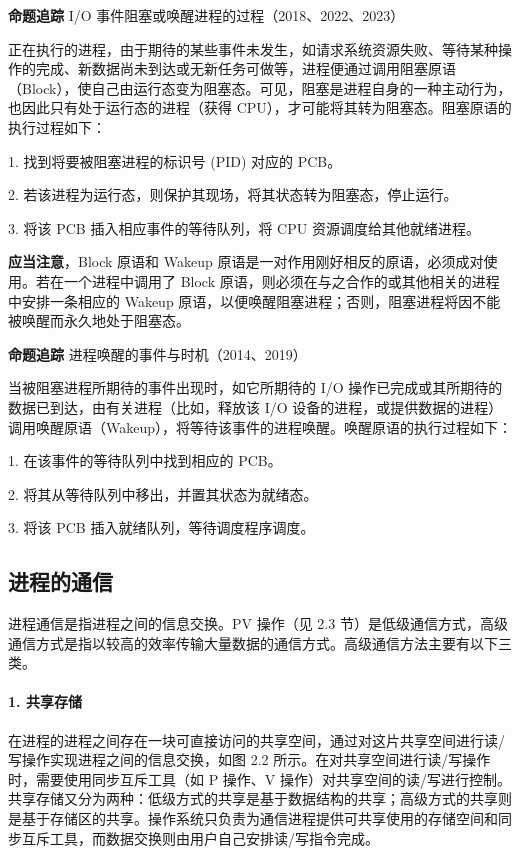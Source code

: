 \documentclass{ctexbook}
\begin{document}
	\textbf{命题追踪} I/O 事件阻塞或唤醒进程的过程（2018、2022、2023）
	
	正在执行的进程，由于期待的某些事件未发生，如请求系统资源失败、等待某种操作的完成、新数据尚未到达或无新任务可做等，进程便通过调用阻塞原语（Block），使自己由运行态变为阻塞态。可见，阻塞是进程自身的一种主动行为，也因此只有处于运行态的进程（获得 CPU），才可能将其转为阻塞态。阻塞原语的执行过程如下：
	
	1. 找到将要被阻塞进程的标识号 (PID) 对应的 PCB。
	
	2. 若该进程为运行态，则保护其现场，将其状态转为阻塞态，停止运行。
	
	3. 将该 PCB 插入相应事件的等待队列，将 CPU 资源调度给其他就绪进程。
	
	\textbf{应当注意}，Block 原语和 Wakeup 原语是一对作用刚好相反的原语，必须成对使用。若在一个进程中调用了 Block 原语，则必须在与之合作的或其他相关的进程中安排一条相应的 Wakeup 原语，以便唤醒阻塞进程；否则，阻塞进程将因不能被唤醒而永久地处于阻塞态。
	
	\textbf{命题追踪} 进程唤醒的事件与时机（2014、2019）
	
	当被阻塞进程所期待的事件出现时，如它所期待的 I/O 操作已完成或其所期待的数据已到达，由有关进程（比如，释放该 I/O 设备的进程，或提供数据的进程）调用唤醒原语（Wakeup），将等待该事件的进程唤醒。唤醒原语的执行过程如下：
	
	1. 在该事件的等待队列中找到相应的 PCB。
	
	2. 将其从等待队列中移出，并置其状态为就绪态。
	
	3. 将该 PCB 插入就绪队列，等待调度程序调度。
	
	\subsection{进程的通信}
	
	进程通信是指进程之间的信息交换。PV 操作（见 2.3 节）是低级通信方式，高级通信方式是指以较高的效率传输大量数据的通信方式。高级通信方法主要有以下三类。
	
	\paragraph{1. 共享存储}
	
	在进程的进程之间存在一块可直接访问的共享空间，通过对这片共享空间进行读/写操作实现进程之间的信息交换，如图 2.2 所示。在对共享空间进行读/写操作时，需要使用同步互斥工具（如 P 操作、V 操作）对共享空间的读/写进行控制。共享存储又分为两种：低级方式的共享是基于数据结构的共享；高级方式的共享则是基于存储区的共享。操作系统只负责为通信进程提供可共享使用的存储空间和同步互斥工具，而数据交换则由用户自己安排读/写指令完成。
	
\end{document}
